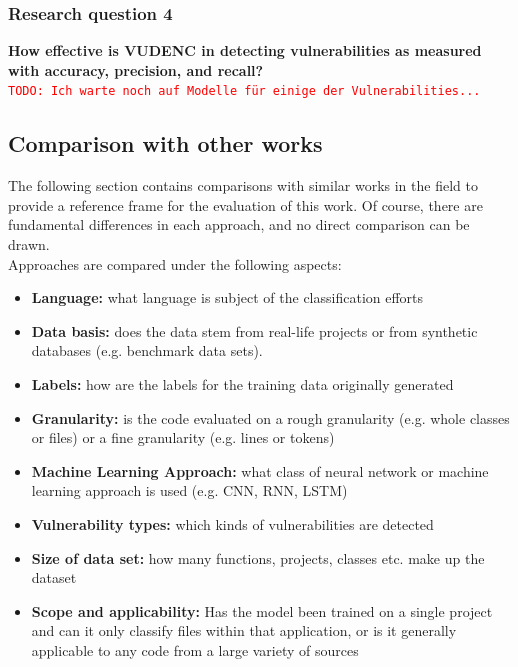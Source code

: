 \documentclass[
	a4paper,
	pagesize,
	pdftex,
	12pt,
	twoside, %
	BCOR=5mm, %
	ngerman,
	fleqn,
	final,
	]{scrartcl}
\begin{document}
\subsubsection{Research question 4}
\textbf{How effective is VUDENC in detecting vulnerabilities as measured with accuracy, precision, and recall? }\\
\textcolor{red}{\texttt{TODO: Ich warte noch auf Modelle für einige der Vulnerabilities...}}

\subsection{Comparison with other works}

The following section contains comparisons with similar works in the field to provide a reference frame for the evaluation of this work. Of course, there are fundamental differences in each approach, and no direct comparison can be drawn.\\
Approaches are compared under the following aspects:\\
\begin{itemize}
	\item \textbf{Language:} what language is subject of the classification efforts
	\item \textbf{Data basis:} does the data stem from real-life projects or from synthetic databases (e.g. benchmark data sets).
	\item \textbf{Labels:} how are the labels for the training data originally generated
	\item \textbf{Granularity:} is the code evaluated on a rough granularity (e.g. whole classes or files) or a fine granularity (e.g. lines or tokens)
	\item \textbf{Machine Learning Approach:} what class of neural network or machine learning approach is used (e.g. CNN, RNN, LSTM)
	\item \textbf{Vulnerability types:} which kinds of vulnerabilities are detected
	\item \textbf{Size of data set:} how many functions, projects, classes etc. make up the dataset
	\item \textbf{Scope and applicability:} Has the model been trained on a single project and can it only classify files within that application, or is it generally applicable to any code from a large variety of sources
\end{itemize}
\end{document}
